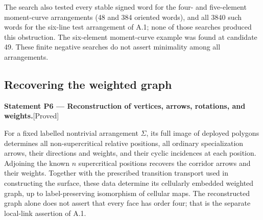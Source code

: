 \documentclass[11pt,a4paper]{article}
\newenvironment{resultenv}[3]{\par\medskip\phantomsection\label{#1}\noindent\textbf{Statement #1 --- #3.}\quad\textsf{[#2]}\par\smallskip\noindent\ignorespaces}{\par\medskip}
\begin{document}
The search also tested every stable signed word for the four- and
five-element moment-curve arrangements (48 and 384 oriented words),
and all 3840 such words for the six-line test arrangement of A.1;
none of those searches produced this obstruction.  The six-element
moment-curve example was found at candidate 49.  These finite negative
searches do not assert minimality among all arrangements.

\subsection{Recovering the weighted graph}

\begin{resultenv}{P6}{Proved}{Reconstruction of vertices, arrows, rotations, and weights}
For a fixed labelled nontrivial arrangement $\Sigma$, its full image of
deployed polygons determines all non-supercritical relative positions,
all ordinary specialization arrows, their directions and weights, and
their cyclic incidences at each position.  Adjoining the known $n$
supercritical positions recovers the corridor arrows and their
weights.  Together with the prescribed transition transport used in
constructing the surface, these data determine its cellularly embedded
weighted graph, up to label-preserving isomorphism of cellular maps.
The reconstructed graph alone does not assert that every face has
order four; that is the separate local-link assertion of A.1.
\end{resultenv}
\end{document}
